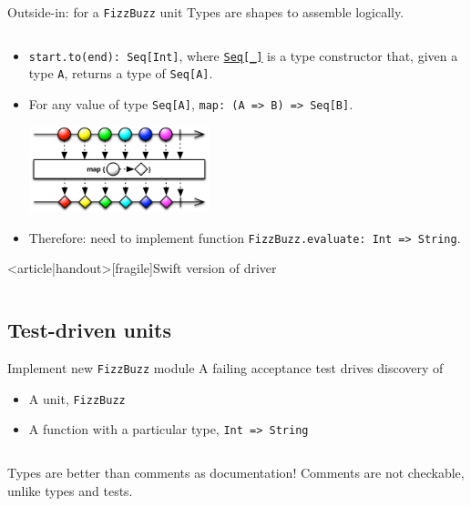 \begin{frame}[fragile]{Outside-in: for a \texttt{FizzBuzz} unit}
  Types are shapes to assemble logically.

  \inputminted[gobble=2]{scala}{Main4.scala}

  \begin{itemize}
  \item \texttt{start.to(end): Seq[Int]}, where \href{http://www.scala-lang.org/api/2.11.0/index.html\#scala.collection.Seq}{\texttt{Seq[_]}} is a \alert{type constructor} that, given a type \texttt{A}, returns a type of \texttt{Seq[A]}.
  \item For any value of type \texttt{Seq[A]}, \texttt{map: (A => B) => Seq[B]}.
  \begin{center}
    \includegraphics[height=2.5cm]{map.png}
  \end{center}
  \item Therefore: need to implement function \texttt{FizzBuzz.evaluate: Int => String}.
  \end{itemize}
\end{frame}

\begin{frame}<article|handout>[fragile]{Swift version of driver}
  \inputminted{ocaml}{Main4.swift}
\end{frame}

\subsection{Test-driven units}

\begin{frame}[fragile]{Implement new \texttt{FizzBuzz} module}
  A failing acceptance test drives \alert{discovery} of
  \begin{itemize}
  \item A \alert{unit}, \texttt{FizzBuzz}
  \item A function with a particular type,
    \texttt{Int => String}
  \end{itemize}

  \inputminted{scala}{FizzBuzz1.scala}

  \begin{block}{\alert{Types} are better than \alert{comments} as \alert{documentation}!}
    Comments are not checkable, unlike types and tests.
  \end{block}
\end{frame}

